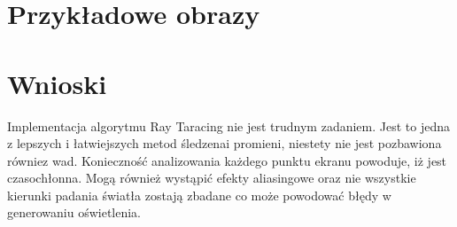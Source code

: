 \documentclass[wide,a4paper,titlepage,12pt] {article}
\begin{document}

\newpage
\section{Przykładowe obrazy}

\newpage
{}

\section{Wnioski}
Implementacja algorytmu Ray Taracing nie jest trudnym zadaniem. Jest to jedna z lepszych i łatwiejszych metod śledzenai promieni, niestety nie jest pozbawiona równiez wad. Konieczność analizowania każdego punktu ekranu powoduje, iż jest czasochłonna.  Mogą również wystąpić efekty aliasingowe oraz nie wszystkie kierunki padania światła zostają zbadane co może powodować błędy w generowaniu oświetlenia.
\end{document}
